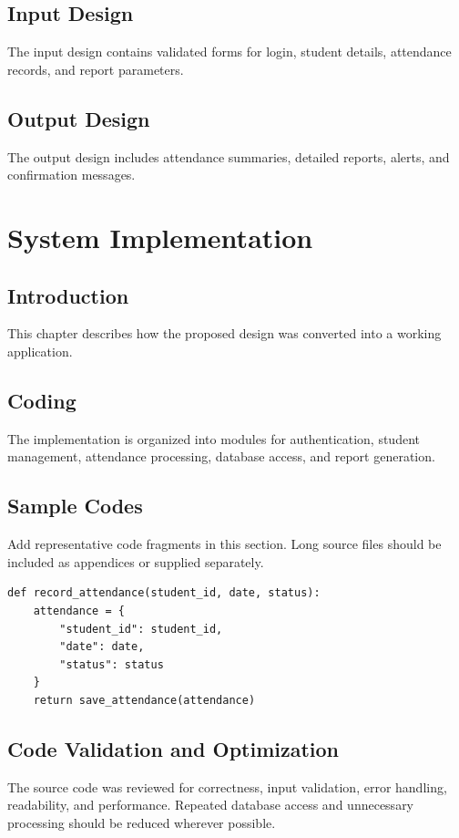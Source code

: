 \documentclass[12pt,a4paper]{report}
\begin{document}
\section{Input Design}
The input design contains validated forms for login, student details, attendance records, and report parameters.

\section{Output Design}
The output design includes attendance summaries, detailed reports, alerts, and confirmation messages.

\chapter{System Implementation}

\section{Introduction}
This chapter describes how the proposed design was converted into a working application.

\section{Coding}
The implementation is organized into modules for authentication, student management, attendance processing, database access, and report generation.

\section{Sample Codes}
Add representative code fragments in this section. Long source files should be included as appendices or supplied separately.

\begin{verbatim}
def record_attendance(student_id, date, status):
    attendance = {
        "student_id": student_id,
        "date": date,
        "status": status
    }
    return save_attendance(attendance)
\end{verbatim}

\section{Code Validation and Optimization}
The source code was reviewed for correctness, input validation, error handling, readability, and performance. Repeated database access and unnecessary processing should be reduced wherever possible.
\end{document}
